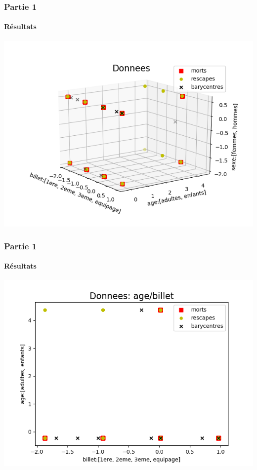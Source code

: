 \documentclass{beamer}
\begin{document}
    \begin{frame}[fragile]
        \frametitle{Partie 1}
        \framesubtitle{Résultats}
        \includegraphics[scale=0.6]{p1-2}
    \end{frame}
    
    \begin{frame}[fragile]
        \frametitle{Partie 1}
        \framesubtitle{Résultats}
        \includegraphics[scale=0.6]{p1-3}
    \end{frame}
    
\end{document}
